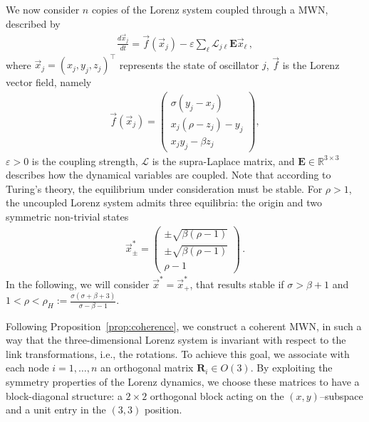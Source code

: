 \documentclass[aps,showpacs,preprintnumbers,amsmath,amssymb,twocolumn,superscriptaddress,floatfix,nofootinbib,10pt,pre]{revtex4-1}
\begin{document}
We now consider $n$ copies of the Lorenz system coupled through a MWN, described by 
\begin{align}
    \label{eq:lorenz_diffusive}
    \frac{d\vec{x}_j}{dt}=\vec{f}(\vec{x}_j)-\varepsilon \sum_\ell \mathcal{L}_{j\ell}\mathbf{E}\vec{x}_\ell\, ,
\end{align}
where $\vec x_j=(x_j,y_j,z_j)^\top$ represents the state of oscillator $j$, $\vec f$ is the Lorenz vector field, namely
\begin{align}
\label{eq:Lorenzf}
    \vec{f}(\vec{x}_j)=\left(\begin{matrix}
        \sigma(y_j-x_j)\\x_j(\rho-z_j)-y_j\\x_jy_j-\beta z_j
    \end{matrix}\right),
\end{align}
$\varepsilon>0$ is the coupling strength, $\mathcal L$ is the supra-Laplace matrix, and $\mathbf E\in\mathbb R^{3\times 3}$ describes how the dynamical variables are coupled. Note that according to Turing's theory, the equilibrium under consideration must be stable. For $\rho>1$, the uncoupled Lorenz system admits three equilibria: the origin and two symmetric non-trivial states
\begin{align}\label{eq:eqLorenz}
\vec{x}_{\pm}^*
    =
    \begin{pmatrix}
        \pm\sqrt{\beta(\rho-1)} \\
        \pm\sqrt{\beta(\rho-1)} \\
        \rho-1
    \end{pmatrix}\, .
\end{align}
In the following, we will consider $\vec{x}^*=\vec{x}^*_+$,
that results stable if $\sigma > \beta +1$ and $1<\rho<\rho_H := \frac{\sigma(\sigma + \beta + 3)}{\sigma - \beta - 1}$.

Following Proposition~\ref{prop:coherence}, we construct a coherent MWN, in such a way that the three-dimensional Lorenz system is invariant with respect to the link transformations, i.e., the rotations. To achieve this goal, we associate with each node $i=1,\dots,n$ an orthogonal matrix $\mathbf R_i\in O(3)$. By exploiting the symmetry properties of the Lorenz dynamics, we choose these matrices to have a block-diagonal structure: a $2\times2$ orthogonal block acting on the $(x,y)$--subspace and a unit entry in the $(3,3)$ position.
\end{document}
